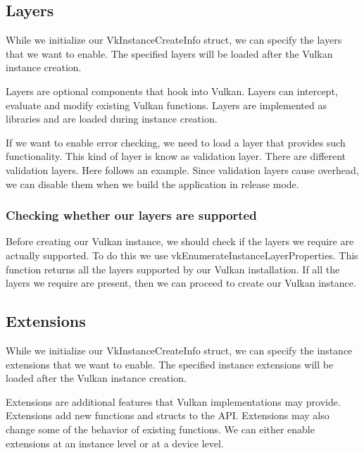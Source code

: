 \subsection{Layers}

While we initialize our VkInstanceCreateInfo struct, we can specify the layers
that we want to enable.
The specified layers will be loaded after the Vulkan instance creation.

Layers are optional components that hook into Vulkan.
Layers can intercept, evaluate and modify existing Vulkan functions.
Layers are implemented as libraries and are loaded during instance creation.

If we want to enable error checking, we need to load a layer that
provides such functionality.
This kind of layer is know as validation layer.
There are different validation layers.
Here follows an example. Since validation layers cause overhead, we can
disable them when we build the application in release mode.

\begin{minipage}{\linewidth}{\noindent}
    
\end{minipage}

\subsubsection{Checking whether our layers are supported}

Before creating our Vulkan instance, we should check if the layers we require are
actually supported.
To do this we use vkEnumerateInstanceLayerProperties.
This function returns all the layers supported by our Vulkan installation.
If all the layers we require are present, then we can proceed to create our
Vulkan instance.

\subsection{Extensions}

While we initialize our VkInstanceCreateInfo struct, we can specify the instance
extensions that we want to enable.
The specified instance extensions will be loaded after the Vulkan instance creation.

Extensions are  additional features that Vulkan implementations may provide.
Extensions add new functions and structs to the API.
Extensions may also change some of the behavior of existing functions.
We can either enable extensions at an instance level or at a device level.

